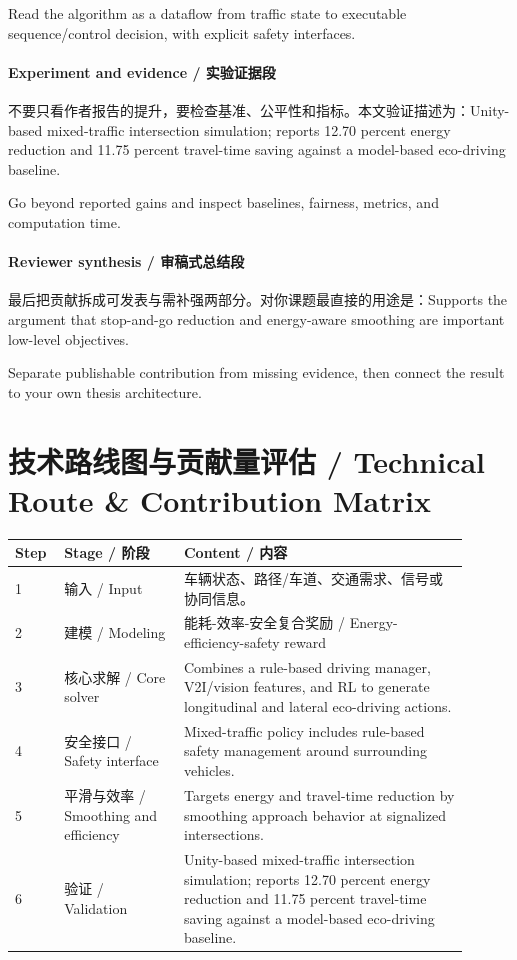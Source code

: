 \documentclass[UTF8,a4paper,11pt,fontset=fandol]{ctexart}
\begin{document}
Read the algorithm as a dataflow from traffic state to executable sequence/control decision, with explicit safety interfaces.

\paragraph{Experiment and evidence / 实验证据段}不要只看作者报告的提升，要检查基准、公平性和指标。本文验证描述为：Unity-based mixed-traffic intersection simulation; reports 12.70 percent energy reduction and 11.75 percent travel-time saving against a model-based eco-driving baseline.

Go beyond reported gains and inspect baselines, fairness, metrics, and computation time.

\paragraph{Reviewer synthesis / 审稿式总结段}最后把贡献拆成可发表与需补强两部分。对你课题最直接的用途是：Supports the argument that stop-and-go reduction and energy-aware smoothing are important low-level objectives.

Separate publishable contribution from missing evidence, then connect the result to your own thesis architecture.


\section{技术路线图与贡献量评估 / Technical Route \& Contribution Matrix}
\begin{longtable}{p{0.08\linewidth}p{0.24\linewidth}p{0.58\linewidth}}
\toprule
Step & Stage / 阶段 & Content / 内容\\
\midrule
1 & 输入 / Input & 车辆状态、路径/车道、交通需求、信号或协同信息。 \\
2 & 建模 / Modeling & 能耗-效率-安全复合奖励 / Energy-efficiency-safety reward \\
3 & 核心求解 / Core solver & Combines a rule-based driving manager, V2I/vision features, and RL to generate longitudinal and lateral eco-driving actions. \\
4 & 安全接口 / Safety interface & Mixed-traffic policy includes rule-based safety management around surrounding vehicles. \\
5 & 平滑与效率 / Smoothing and efficiency & Targets energy and travel-time reduction by smoothing approach behavior at signalized intersections. \\
6 & 验证 / Validation & Unity-based mixed-traffic intersection simulation; reports 12.70 percent energy reduction and 11.75 percent travel-time saving against a model-based eco-driving baseline. \\
\bottomrule
\end{longtable}
\end{document}

